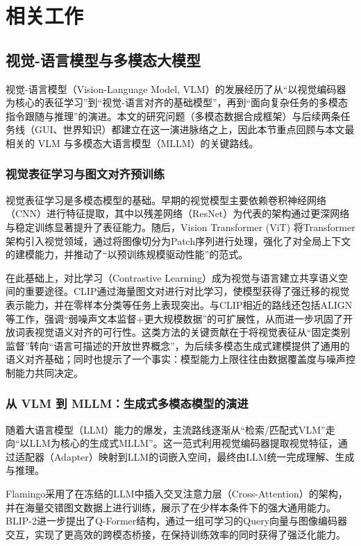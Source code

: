 \chapter{相关工作}

\section{视觉-语言模型与多模态大模型}
视觉-语言模型（Vision-Language Model, VLM）的发展经历了从“以视觉编码器为核心的表征学习”到“视觉-语言对齐的基础模型”，再到“面向复杂任务的多模态指令跟随与推理”的演进。本文的研究问题（多模态数据合成框架）与后续两条任务线（GUI、世界知识）都建立在这一演进脉络之上，因此本节重点回顾与本文最相关的 VLM 与多模态大语言模型（MLLM）的关键路线。

\subsection{视觉表征学习与图文对齐预训练}
视觉表征学习是多模态模型的基础。早期的视觉模型主要依赖卷积神经网络（CNN）进行特征提取，其中以残差网络（ResNet）为代表的架构通过更深网络与稳定训练显著提升了表征能力\citep{he2016resnet}。随后，Vision Transformer (ViT) 将Transformer架构引入视觉领域，通过将图像切分为Patch序列进行处理，强化了对全局上下文的建模能力，并推动了“以预训练规模驱动性能”的范式\citep{dosovitskiy2021vit}。

在此基础上，对比学习（Contrastive Learning）成为视觉与语言建立共享语义空间的重要途径。CLIP通过海量图文对进行对比学习，使模型获得了强迁移的视觉表示能力，并在零样本分类等任务上表现突出\citep{radford2021learning}。与CLIP相近的路线还包括ALIGN等工作，强调“弱噪声文本监督+更大规模数据”的可扩展性，从而进一步巩固了开放词表视觉语义对齐的可行性\citep{jia2021align}。这类方法的关键贡献在于将视觉表征从“固定类别监督”转向“语言可描述的开放世界概念”，为后续多模态生成式建模提供了通用的语义对齐基础；同时也提示了一个事实：模型能力上限往往由数据覆盖度与噪声控制能力共同决定。

\subsection{从 VLM 到 MLLM：生成式多模态模型的演进}
随着大语言模型（LLM）能力的爆发，主流路线逐渐从“检索/匹配式VLM”走向“以LLM为核心的生成式MLLM”。这一范式利用视觉编码器提取视觉特征，通过适配器（Adapter）映射到LLM的词嵌入空间，最终由LLM统一完成理解、生成与推理。

Flamingo采用了在冻结的LLM中插入交叉注意力层（Cross-Attention）的架构，并在海量交错图文数据上进行训练，展示了在少样本条件下的强大通用能力\citep{alayrac2022flamingo}。BLIP-2进一步提出了Q-Former结构，通过一组可学习的Query向量与图像编码器交互，实现了更高效的跨模态桥接，在保持训练效率的同时获得了强泛化能力\citep{li2023blip2}。

